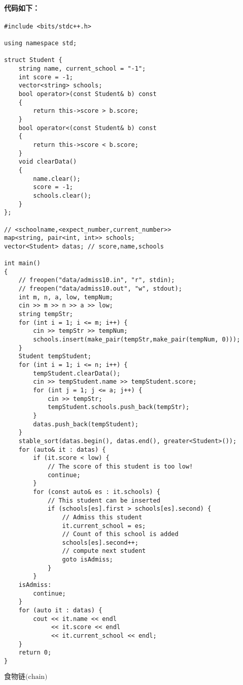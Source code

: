 \documentclass[final,11pt,oneside,UTF8]{report}
\begin{document}
\paragraph{
    代码如下：
}
{\mono
    \begin{lstlisting}
#include <bits/stdc++.h>

using namespace std;

struct Student {
    string name, current_school = "-1";
    int score = -1;
    vector<string> schools;
    bool operator>(const Student& b) const
    {
        return this->score > b.score;
    }
    bool operator<(const Student& b) const
    {
        return this->score < b.score;
    }
    void clearData()
    {
        name.clear();
        score = -1;
        schools.clear();
    }
};

// <schoolname,<expect_number,current_number>>
map<string, pair<int, int>> schools;
vector<Student> datas; // score,name,schools

int main()
{
    // freopen("data/admiss10.in", "r", stdin);
    // freopen("data/admiss10.out", "w", stdout);
    int m, n, a, low, tempNum;
    cin >> m >> n >> a >> low;
    string tempStr;
    for (int i = 1; i <= m; i++) {
        cin >> tempStr >> tempNum;
        schools.insert(make_pair(tempStr,make_pair(tempNum, 0)));
    }
    Student tempStudent;
    for (int i = 1; i <= n; i++) {
        tempStudent.clearData();
        cin >> tempStudent.name >> tempStudent.score;
        for (int j = 1; j <= a; j++) {
            cin >> tempStr;
            tempStudent.schools.push_back(tempStr);
        }
        datas.push_back(tempStudent);
    }
    stable_sort(datas.begin(), datas.end(), greater<Student>());
    for (auto& it : datas) {
        if (it.score < low) {
            // The score of this student is too low!
            continue;
        }
        for (const auto& es : it.schools) {
            // This student can be inserted
            if (schools[es].first > schools[es].second) { 
                // Admiss this student    
                it.current_school = es;
                // Count of this school is added 
                schools[es].second++;
                // compute next student 
                goto isAdmiss; 
            }
        }
    isAdmiss:
        continue;
    }
    for (auto it : datas) {
        cout << it.name << endl
             << it.score << endl
             << it.current_school << endl;
    }
    return 0;
}
\end{lstlisting}
}
\newpage

\newpage
\centerline{\LARGE{$\textbf{食物链}\text{(chain)}$}}
\end{document}
